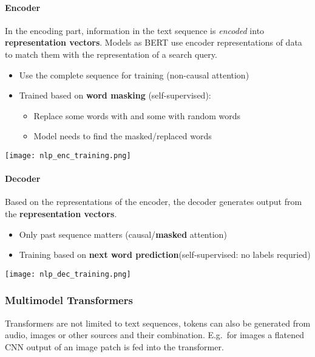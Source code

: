 \paragraph{Encoder}
In the encoding part, information in the text sequence is \textit{encoded} into \textbf{representation vectors}. Models as BERT use encoder representations of data to match them with the representation of a search query.
\newpar{}
\begin{itemize}
    \item Use the complete sequence for training (non-causal attention)
    \item Trained based on \textbf{word masking} (self-supervised):
          \begin{itemize}
              \item Replace some words with  and some with random words
              \item Model needs to find the masked/replaced words
          \end{itemize}
\end{itemize}
\begin{center}
    \texttt{[image: nlp\_enc\_training.png]}
\end{center}


\paragraph{Decoder}

Based on the representations of the encoder, the decoder generates output from the \textbf{representation vectors}.
\newpar{}
\begin{itemize}
    \item Only past sequence matters (causal/\textbf{masked} attention)
    \item Training based on \textbf{next word prediction}\newline (self-supervised: no labels requried)
\end{itemize}
\begin{center}
    \texttt{[image: nlp\_dec\_training.png]}
\end{center}

\subsubsection{Multimodel Transformers}
Transformers are not limited to text sequences, tokens can also be generated from audio, images or other sources and their combination. E.g.\ for images a flatened CNN output of an image patch is fed into the transformer.




